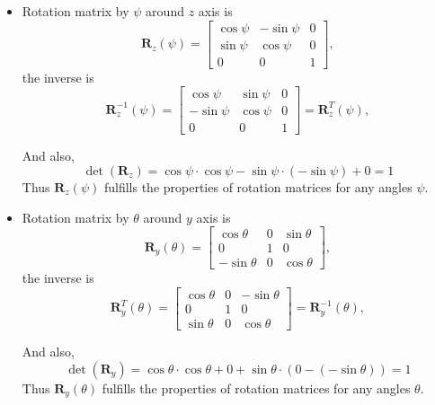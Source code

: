 \documentclass[a4paper, twoside, english]{article}
\newcommand{\br}{\textbf{R}}
\begin{document}
\begin{enumerate}
	\begin{itemize}
		\item Rotation matrix by $ \psi $ around $ z $ axis is
		\begin{equation*}
			\br_z(\psi) = \left[
			\begin{array}{ccc}
				\cos \psi & -\sin \psi & 0 \\
				\sin \psi & \cos \psi & 0 \\
				0 & 0 & 1
			\end{array}
			\right],
		\end{equation*}
		the inverse is
		\begin{equation*}
			\br_z^{-1}(\psi) = \left[
			\begin{array}{ccc}
				\cos \psi & \sin \psi & 0 \\
				-\sin \psi & \cos \psi & 0 \\
				0 & 0 & 1
			\end{array}
			\right] = \br_z^T(\psi),
		\end{equation*}
		
		And also, 
		\begin{equation*}
			\det(\br_z) = \cos \psi \cdot \cos \psi -\sin \psi \cdot (-\sin \psi) + 0 = 1
		\end{equation*}
		Thus $ \br_z(\psi) $ fulfills the properties of rotation matrices for any angles $ \psi $.
		
		\item 
		
		Rotation matrix by $ \theta $ around $ y $ axis is
		\begin{equation*}
			\br_y(\theta) = \left[
			\begin{array}{ccc}
				\cos \theta & 0 & \sin \theta \\
				0 & 1 & 0 \\
				-\sin \theta & 0 & \cos \theta
			\end{array}
			\right],
		\end{equation*}
		the inverse is
		\begin{equation*}
			\br_y^T(\theta) = \left[
			\begin{array}{ccc}
				\cos \theta & 0 & -\sin \theta \\
				0 & 1 & 0 \\
				\sin \theta & 0 & \cos \theta
			\end{array}
			\right]= \br_y^{-1}(\theta),
		\end{equation*}	
		
		And also, 
		\begin{equation*}
			\det(\br_y) = \cos \theta \cdot \cos \theta + 0 + \sin \theta \cdot (0-(-\sin \theta)) = 1
		\end{equation*}
		Thus $ \br_y(\theta) $ fulfills the properties of rotation matrices for any angles $ \theta $.
		

\end{itemize}
\end{enumerate}
\end{document}
